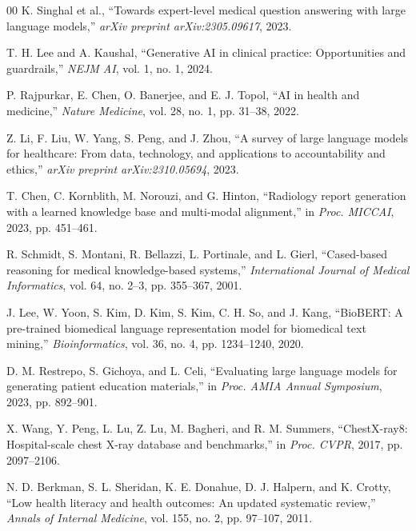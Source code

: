 \documentclass[conference]{IEEEtran}
\begin{document}
\begin{thebibliography}{00}
 K. Singhal et al., ``Towards expert-level medical question answering with large language models,'' \textit{arXiv preprint arXiv:2305.09617}, 2023.

 T. H. Lee and A. Kaushal, ``Generative AI in clinical practice: Opportunities and guardrails,'' \textit{NEJM AI}, vol. 1, no. 1, 2024.

 P. Rajpurkar, E. Chen, O. Banerjee, and E. J. Topol, ``AI in health and medicine,'' \textit{Nature Medicine}, vol. 28, no. 1, pp. 31--38, 2022.

 Z. Li, F. Liu, W. Yang, S. Peng, and J. Zhou, ``A survey of large language models for healthcare: From data, technology, and applications to accountability and ethics,'' \textit{arXiv preprint arXiv:2310.05694}, 2023.

 T. Chen, C. Kornblith, M. Norouzi, and G. Hinton, ``Radiology report generation with a learned knowledge base and multi-modal alignment,'' in \textit{Proc. MICCAI}, 2023, pp. 451--461.

 R. Schmidt, S. Montani, R. Bellazzi, L. Portinale, and L. Gierl, ``Cased-based reasoning for medical knowledge-based systems,'' \textit{International Journal of Medical Informatics}, vol. 64, no. 2--3, pp. 355--367, 2001.

 J. Lee, W. Yoon, S. Kim, D. Kim, S. Kim, C. H. So, and J. Kang, ``BioBERT: A pre-trained biomedical language representation model for biomedical text mining,'' \textit{Bioinformatics}, vol. 36, no. 4, pp. 1234--1240, 2020.

 D. M. Restrepo, S. Gichoya, and L. Celi, ``Evaluating large language models for generating patient education materials,'' in \textit{Proc. AMIA Annual Symposium}, 2023, pp. 892--901.

 X. Wang, Y. Peng, L. Lu, Z. Lu, M. Bagheri, and R. M. Summers, ``ChestX-ray8: Hospital-scale chest X-ray database and benchmarks,'' in \textit{Proc. CVPR}, 2017, pp. 2097--2106.

 N. D. Berkman, S. L. Sheridan, K. E. Donahue, D. J. Halpern, and K. Crotty, ``Low health literacy and health outcomes: An updated systematic review,'' \textit{Annals of Internal Medicine}, vol. 155, no. 2, pp. 97--107, 2011.
\end{thebibliography}
\end{document}
